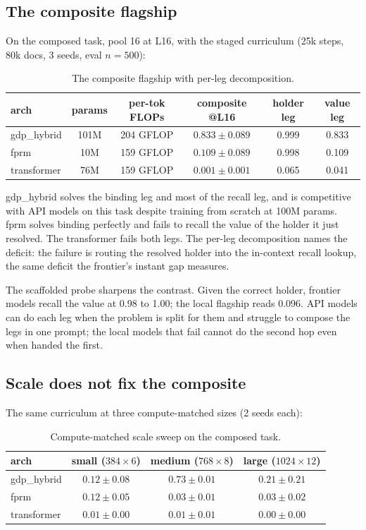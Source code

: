 \documentclass[11pt]{article}
\begin{document}
\subsection{The composite flagship}

On the composed task, pool 16 at L16, with the staged curriculum (25k steps, 80k docs, 3
seeds, eval $n=500$):

\begin{table}[h]
\centering
\begin{tabular}{lccccc}
\toprule
arch & params & per-tok FLOPs & composite @L16 & holder leg & value leg \\
\midrule
gdp\_hybrid & 101M & 204 GFLOP & $0.833 \pm 0.089$ & 0.999 & 0.833 \\
fprm & 10M & 159 GFLOP & $0.109 \pm 0.089$ & 0.998 & 0.109 \\
transformer & 76M & 159 GFLOP & $0.001 \pm 0.001$ & 0.065 & 0.041 \\
\bottomrule
\end{tabular}
\caption{The composite flagship with per-leg decomposition.}
\label{tab:flagship}
\end{table}

gdp\_hybrid solves the binding leg and most of the recall leg, and is competitive with API
models on this task despite training from scratch at 100M params. fprm solves binding
perfectly and fails to recall the value of the holder it just resolved. The transformer fails
both legs. The per-leg decomposition names the deficit: the failure is routing the resolved holder into the in-context
recall lookup, the same deficit the frontier's instant gap measures.

The scaffolded probe sharpens the contrast. Given the correct holder, frontier models recall
the value at 0.98 to 1.00; the local flagship reads 0.096. API models can do each leg when the
problem is split for them and struggle to compose the legs in one prompt; the local models
that fail cannot do the second hop even when handed the first.

\subsection{Scale does not fix the composite}

The same curriculum at three compute-matched sizes (2 seeds each):

\begin{table}[h]
\centering
\begin{tabular}{lccc}
\toprule
arch & small ($384\times6$) & medium ($768\times8$) & large ($1024\times12$) \\
\midrule
gdp\_hybrid & $0.12 \pm 0.08$ & $0.73 \pm 0.01$ & $0.21 \pm 0.21$ \\
fprm & $0.12 \pm 0.05$ & $0.03 \pm 0.01$ & $0.03 \pm 0.02$ \\
transformer & $0.01 \pm 0.00$ & $0.01 \pm 0.01$ & $0.00 \pm 0.00$ \\
\bottomrule
\end{tabular}
\caption{Compute-matched scale sweep on the composed task.}
\label{tab:scale}
\end{table}
\end{document}
